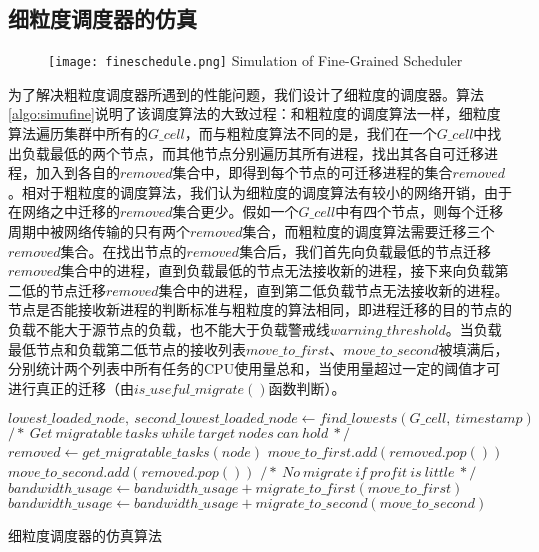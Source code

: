 \subsection{细粒度调度器的仿真}
\begin{figure}[!htp]
  \centering
  \texttt{[image: fineschedule.png]}
    {Simulation of Fine-Grained Scheduler}
  \label{fig:simufine}
\end{figure}
为了解决粗粒度调度器所遇到的性能问题，我们设计了细粒度的调度器。算法\ref{algo:simufine}说明了该调度算法的大致过程：和粗粒度的调度算法一样，细粒度算法遍历集群中所有的$G\_cell$，而与粗粒度算法不同的是，我们在一个$G\_cell$中找出负载最低的两个节点，而其他节点分别遍历其所有进程，找出其各自可迁移进程，加入到各自的$removed$集合中，即得到每个节点的可迁移进程的集合$removed$。相对于粗粒度的调度算法，我们认为细粒度的调度算法有较小的网络开销，由于在网络之中迁移的$removed$集合更少。假如一个$G\_cell$中有四个节点，则每个迁移周期中被网络传输的只有两个$removed$集合，而粗粒度的调度算法需要迁移三个$removed$集合。在找出节点的$removed$集合后，我们首先向负载最低的节点迁移$removed$集合中的进程，直到负载最低的节点无法接收新的进程，接下来向负载第二低的节点迁移$removed$集合中的进程，直到第二低负载节点无法接收新的进程。节点是否能接收新进程的判断标准与粗粒度的算法相同，即进程迁移的目的节点的负载不能大于源节点的负载，也不能大于负载警戒线$warning\_threshold$。当负载最低节点和负载第二低节点的接收列表$move\_to\_first$、$move\_to\_second$被填满后，分别统计两个列表中所有任务的CPU使用量总和，当使用量超过一定的阈值才可进行真正的迁移（由$is\_useful\_migrate()$函数判断）。
\begin{algorithm}[h]
\begin{algorithmic}[1]
\State $lowest\_loaded\_node,\ second\_lowest\_loaded\_node \gets find\_lowests(G\_cell,\  timestamp)$
\State
{}
\State $/*\ Get\ migratable\ tasks\ while\ target\ nodes\ can\ hold\ */$
\State $removed \gets get\_migratable\_tasks(node)$
\State $move\_to\_first.add(removed.pop())$
\EndWhile
{}
\State $move\_to\_second.add(removed.pop())$
\EndWhile
\State
\State $/*\ No\ migrate\ if\ profit\ is\ little\ */$
\State $bandwidth\_usage \gets bandwidth\_usage + migrate\_to\_first(move\_to\_first)$
\EndIf
{}
\State $bandwidth\_usage \gets bandwidth\_usage + migrate\_to\_second(move\_to\_second)$
\EndIf
\EndFor
\EndFor
\end{algorithmic}
\caption{细粒度调度器的仿真算法}
\label{algo:simufine}
\end{algorithm}

